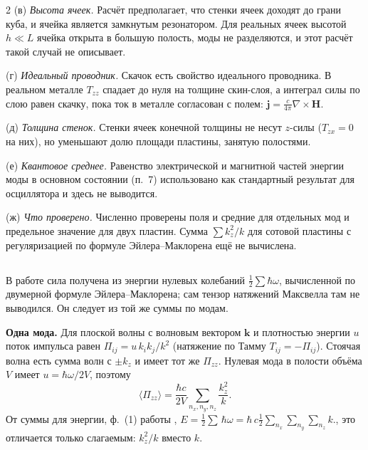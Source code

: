 \documentclass[twoside, 10pt]{article}
\def\myvspacebeforesubsection{-2.0mm}
\def\myvspaceaftersubsection{-2.5mm}
\begin{document}
\begin{multicols}{2}
(в) \textit{Высота ячеек.} Расчёт предполагает, что стенки ячеек доходят до грани
куба, и ячейка является замкнутым резонатором. Для реальных ячеек высотой $h\ll L$
ячейка открыта в большую полость, моды не разделяются, и этот расчёт такой случай
не описывает.

(г) \textit{Идеальный проводник.} Скачок есть свойство идеального проводника. В
реальном металле $T_{zz}$ спадает до нуля на толщине скин-слоя, а интеграл силы по
слою равен скачку, пока ток в металле согласован с полем: $\mathbf j=\frac c{4\pi}\nabla\times\mathbf H$.

(д) \textit{Толщина стенок.} Стенки ячеек конечной толщины не несут $z$-силы
($T_{zx}=0$ на них), но уменьшают долю площади пластины, занятую полостями.

(е) \textit{Квантовое среднее.} Равенство электрической и магнитной частей
энергии моды в основном состоянии (п.~7) использовано как стандартный результат
для осциллятора и здесь не выводится.

(ж) \textit{Что проверено.} Численно проверены поля и средние для отдельных мод
и предельное значение для двух пластин. Сумма $\sum k_z^2/k$ для сотовой пластины с
регуляризацией по формуле Эйлера--Маклорена \cite{Drozdov2024} ещё не вычислена.

\vspace{\myvspacebeforesubsection}
\subsection*{}
\vspace{\myvspaceaftersubsection}

В работе \cite{Drozdov2024} сила получена из энергии нулевых колебаний
$\frac12\sum\hbar\omega$, вычисленной по двумерной формуле Эйлера--Маклорена;
сам тензор натяжений Максвелла там не выводился. Он следует из той же суммы по модам.

\textbf{Одна мода.} Для плоской волны с волновым вектором $\mathbf{k}$ и плотностью
энергии $u$ поток импульса равен $\Pi_{ij}=u\,k_ik_j/k^2$ (натяжение по Тамму
$T_{ij}=-\Pi_{ij}$). Стоячая волна есть сумма волн с $\pm k_z$ и имеет тот же
$\Pi_{zz}$. Нулевая мода в полости объёма $V$ имеет $u=\hbar\omega/2V$, поэтому
\[
\langle\Pi_{zz}\rangle=\frac{\hbar c}{2V}\sum_{n_x,n_y,n_z}\frac{k_z^2}{k}.
\]
От суммы для энергии, ф.~(1) работы \cite{Drozdov2024},
$E = \frac{1}{2}\sum\,\hbar\omega = \hbar\,c\frac{1}{2}\sum\limits_{n_x}^{}\sum\limits_{n_y}^{}\sum\limits_{n_z}^{}k.$,
это отличается только
слагаемым: $k_z^2/k$ вместо $k$.


\end{multicols}
\end{document}
